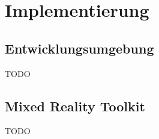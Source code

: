 \chapter{Implementierung}

\section{Entwicklungsumgebung}
TODO

\section{Mixed Reality Toolkit}
TODO